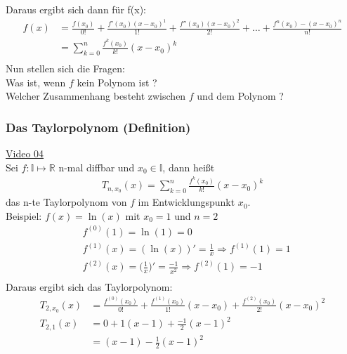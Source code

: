 Daraus ergibt sich dann für f(x):\\
\begin{align*}
f(x)&=\frac{f(x_0)}{0!}+\frac{f'(x_0)(x-x_0)^1}{1!}+\frac{f''(x_0)(x-x_0)^2}{2!}+\ldots +\frac{f^n(x_0)-(x-x_0)^n}{n!}\\
&=\sum\limits_{k=0}^{n}\frac{f^k(x_0)}{k!}(x-x_0)^k\\
\end{align*}
Nun stellen sich die Fragen:\\
Was ist, wenn $ f $ kein Polynom ist ?\\
Welcher Zusammenhang besteht zwischen $ f $ und dem Polynom ?\\
\subsubsection{Das Taylorpolynom (Definition) }
\href{https://youtu.be/bSzpFWy4gTE}{Video 04}\\
Sei $ f: \mathbb{I}\longmapsto\mathbb{R} $ n-mal diffbar und $ x_0\in  \mathbb{I} $, dann heißt
\begin{align*}
T_{n,x_0}(x)=\sum\limits_{k=0}^{n}\frac{f^k(x_0)}{k!}(x-x_0)^k
\end{align*}
das n-te Taylorpolynom von $ f $ im Entwicklungspunkt $ x_0 $.\vspace*{2mm}\\
Beispiel: $ f(x)=\ln(x) $ mit $ x_0=1 $ und $ n=2 $\\
\begin{align*}
&f^{(0)}(1)=\ln(1)=0\\
&f^{(1)}(x)=(\ln(x))'=\frac{1}{x}\Rightarrow f^{(1)}(1)=1\\
&f^{(2)}(x)=\bigg(\frac{1}{x}\bigg)'=\frac{-1}{x^2}\Rightarrow f^{(2)}(1)=-1\\
\end{align*}
Daraus ergibt sich das Taylorpolynom:\\
\begin{align*}
T_{2,x_0}(x)&=\frac{f^{(0)}(x_0)}{0!}+\frac{f^{(1)}(x_0)}{1!}(x-x_0)+\frac{f^{(2)}(x_0)}{2!}(x-x_0)^2\\
T_{2,1}(x)&=0+1(x-1)+\frac{-1}{2}(x-1)^2\\
&=(x-1)-\frac{1}{2}(x-1)^2\\
\end{align*}
